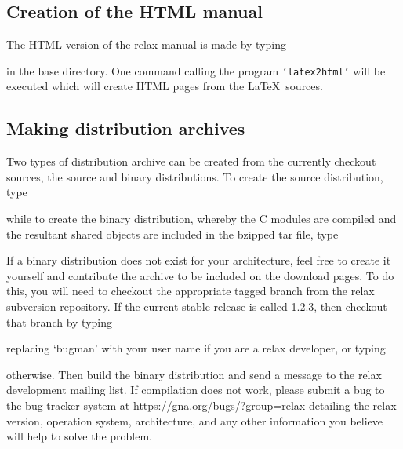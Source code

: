 \subsection{Creation of the HTML manual}

The HTML version of the relax manual is made by typing


in the base directory.  One command calling the program \texttt{`latex2html'} will be executed which will create HTML pages from the \LaTeX\ sources.


\subsection{Making distribution archives}

Two types of distribution archive can be created from the currently checkout sources, the source and binary distributions.  To create the source distribution, type 


while to create the binary distribution, whereby the C modules are compiled and the resultant shared objects are included in the bzipped tar file, type


If a binary distribution does not exist for your architecture, feel free to create it yourself and contribute the archive to be included on the download pages.  To do this, you will need to checkout the appropriate tagged branch from the relax subversion repository.  If the current stable release is called 1.2.3, then checkout that branch by typing


replacing `bugman' with your user name if you are a relax developer, or typing


otherwise.  Then build the binary distribution and send a message to the relax development mailing list.  If compilation does not work, please submit a bug to the bug tracker system at \href{https://gna.org/bugs/?group=relax}{https://gna.org/bugs/?group=relax} detailing the relax version, operation system, architecture, and any other information you believe will help to solve the problem.


